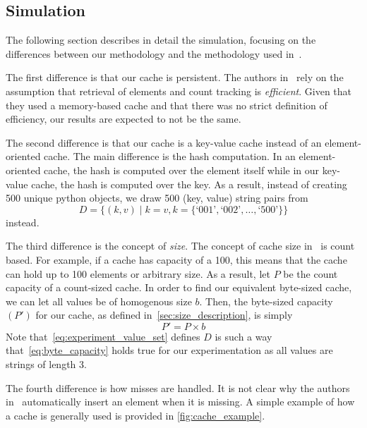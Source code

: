 \documentclass[11pt, journal]{IEEEtran}
\begin{document}
\subsection{Simulation\label{sec:simulation}}
The following section describes in detail the simulation, focusing on the differences
between our methodology and the methodology used in~\cite{shah2023ImprovedCacheEviction}.

The first difference is that our cache is persistent.
The authors in~\cite{shah2023ImprovedCacheEviction} rely on the assumption
that retrieval of elements and count tracking is \textit{efficient}. Given
that they used a memory-based cache and that there was no strict definition
of efficiency, our results are expected to not be the same.

The second difference is that our cache is a key-value cache instead
of an element-oriented cache. The main difference is the hash computation.
In an element-oriented cache, the hash is computed over the element itself
while in our key-value cache, the hash is computed over the key.
As a result, instead of creating 500 unique python objects,
we draw 500 (key, value) string pairs from
\begin{equation}
D = \{(k, v) \mid k = v, k = \{\text{`001'}, \text{`002'}, \ldots, \text{`500'}\}\}
\label{eq:experiment_value_set}
\end{equation}
instead.

The third difference is the concept of \textit{size}.
The concept of cache size in~\cite{shah2023ImprovedCacheEviction}
is count based. For example, if a cache has capacity of a 100,
this means that the cache can hold up to 100 elements or
arbitrary size. As a result, let $P$ be the count capacity
of a count-sized cache. In order to find our equivalent byte-sized
cache, we can let all values be of homogenous size $b$.
Then, the byte-sized capacity $(P')$ for our cache, as defined
in~\ref{sec:size_description}, is simply
\begin{equation}
    P' = P \times b
    \label{eq:byte_capacity}
\end{equation}
Note that~\autoref{eq:experiment_value_set} defines $D$ is such a way
that~\autoref{eq:byte_capacity} holds true for our experimentation
as all values are strings of length 3.

The fourth difference is how misses are handled.
It is not clear why the
authors in~\cite{shah2023ImprovedCacheEviction}
automatically insert an element when it is missing.
A simple example of how a cache
is generally used is provided in \autoref{fig:cache_example}.
\end{document}
